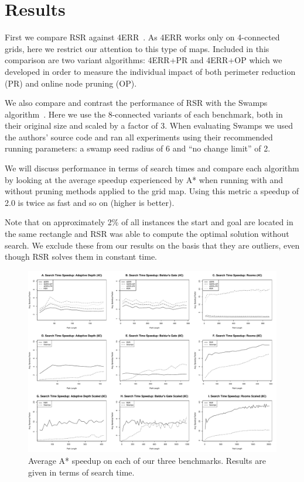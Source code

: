 \section{Results}
\label{sec-results}
First we compare RSR against 4ERR~\cite{harabor10}.
As 4ERR works only on 4-connected grids,
here we restrict our attention to this type of maps.
Included in this comparison are two variant algorithms: 4ERR+PR and 
4ERR+OP which we developed in order to measure the individual impact of both
perimeter reduction (PR) and online node pruning (OP).

We also compare and contrast the performance of RSR
with the Swamps algorithm~\cite{pochter10}.
Here we use the 8-connected variants of each benchmark, both in their original 
size and scaled by a factor of 3.
When evaluating Swamps we used the authors'
source code and ran all experiments using their recommended running parameters:
a swamp seed radius of 6 and ``no change limit'' of 2.  
\par 
We will discuss performance in terms of search times and compare each algorithm
by looking at the average speedup experienced by A* when running with and
without pruning methods applied to the grid map.  Using this metric a speedup of
2.0 is twice as fast and so on (higher is better).
\par
Note that on approximately 2\% of all instances the start and goal are located 
in the same rectangle and RSR was able to compute the optimal solution without
search.
We exclude these from our results on the basis that they are 
outliers, even though RSR solves them in constant time.
\begin{figure}[t]
       \begin{center}
                       \includegraphics[width=1.90\columnwidth, trim = 10mm 10mm 10mm 0mm]{diagrams/speedup.pdf}
       \end{center}
       \caption{Average A* speedup on each of our three benchmarks. 
		Results are given in terms of search time.}
\label{fig-speedup}
\end{figure}

